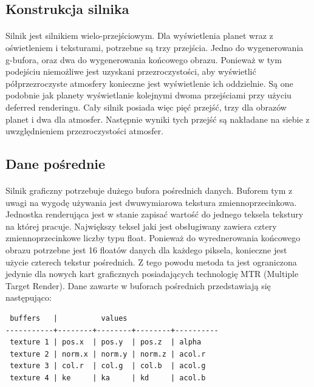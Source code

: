 
\subsection{Konstrukcja silnika}\label{sub:konstrukcja silnika}
\paragraph{}

Silnik jest silnikiem wielo-przejściowym. Dla wyświetlenia planet wraz z oświetleniem i teksturami, potrzebne są trzy przejścia. Jedno do wygenerowania g-bufora, oraz dwa do wygenerowania końcowego obrazu. Ponieważ w tym podejściu niemożliwe jest uzyskani przezroczystości, aby wyświetlić półprzezroczyste atmosfery konieczne jest wyświetlenie ich oddzielnie. Są one podobnie jak planety wyświetlanie kolejnymi dwoma przejściami przy użyciu deferred renderingu. Cały silnik posiada więc pięć przejść, trzy dla obrazów planet i dwa dla atmosfer. Następnie wyniki tych przejść są nakładane na siebie z uwzględnieniem przezroczystości atmosfer.

\subsection{Dane pośrednie}\label{sub:dane pośrednie}
\paragraph{}

Silnik graficzny potrzebuje dużego bufora pośrednich danych. Buforem tym z uwagi na wygodę używania jest dwuwymiarowa tekstura zmiennoprzecinkowa. Jednostka renderująca jest w stanie zapisać wartość do jednego teksela tekstury na której pracuje. Największy teksel jaki jest obsługiwany zawiera cztery zmiennoprzecinkowe liczby typu float. Ponieważ do wyrednerowania końcowego obrazu potrzebne jest 16 floatów danych dla każdego piksela, konieczne jest użycie czterech tekstur pośrednich. Z tego powodu metoda ta jest ograniczona jedynie dla nowych kart graficznych posiadających technologię MTR (Multiple Target Render). Dane zawarte w buforach pośrednich przedstawiają się następująco:

\begin{verbatim}
 buffers   |          values 
-----------+--------+--------+--------+----------
 texture 1 | pos.x  | pos.y  | pos.z  | alpha
 texture 2 | norm.x | norm.y | norm.z | acol.r
 texture 3 | col.r  | col.g  | col.b  | acol.g   
 texture 4 | ke     | ka     | kd     | acol.b
\end{verbatim}

